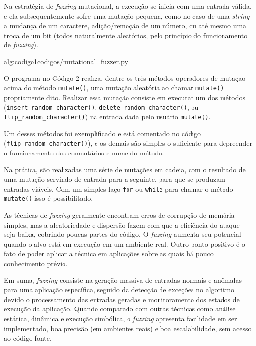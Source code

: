 Na estratégia de \textit{fuzzing} mutacional, a execução se inicia com uma entrada válida, e ela subsequentemente sofre uma mutação pequena, como no caso de uma \textit{string} a mudança de um caractere, adição/remoção de um número, ou até mesmo uma troca de um bit (todos naturalmente aleatórios, pelo princípio do funcionamento de \textit{fuzzing}).

 {alg:codigo1}{codigos/mutational_fuzzer.py}

\bigskip
O programa no Código 2 realiza, dentre os três métodos operadores de mutação acima do método \verb+mutate()+, uma mutação aleatória ao chamar \verb+mutate()+ propriamente dito. Realizar essa mutação consiste em executar um dos métodos (\verb+insert_random_character()+, \verb+delete_random_character()+, ou \verb+flip_random_character()+)  na entrada dada pelo usuário  \verb+mutate()+. 

Um desses métodos foi exemplificado e está comentado no código \linebreak (\verb+flip_random_character()+), e os demais são simples o suficiente para depreender o funcionamento dos comentários e nome do método.

Na prática, são realizadas uma série de mutações em cadeia, com o resultado de uma mutação servindo de entrada para a seguinte, para que se produzam entradas viáveis. Com um simples laço \verb+for+ ou \verb+while+ para chamar o método \verb+mutate()+ isso é possibilitado.

As técnicas de \textit{fuzzing} geralmente encontram erros de corrupção de memória simples, mas a aleatoriedade e dispersão fazem com que a eficiência do ataque seja baixa, cobrindo poucas partes do código. O \textit{fuzzing} aumenta seu potencial quando o alvo está em execução em um ambiente real. Outro ponto positivo é o fato de poder aplicar a técnica em aplicações sobre as quais há pouco conhecimento prévio.

Em suma, \textit{fuzzing} consiste na geração massiva de entradas normais e anômalas para uma aplicação específica, seguido da detecção de exceções no algoritmo devido o processamento das entradas geradas e monitoramento dos estados de execução da aplicação. Quando comparado com outras técnicas como análise estática, dinâmica e execução simbólica, o \textit{fuzzing} apresenta facilidade em ser implementado, boa precisão (em ambientes reais) e boa escalabilidade, sem acesso ao código fonte.

